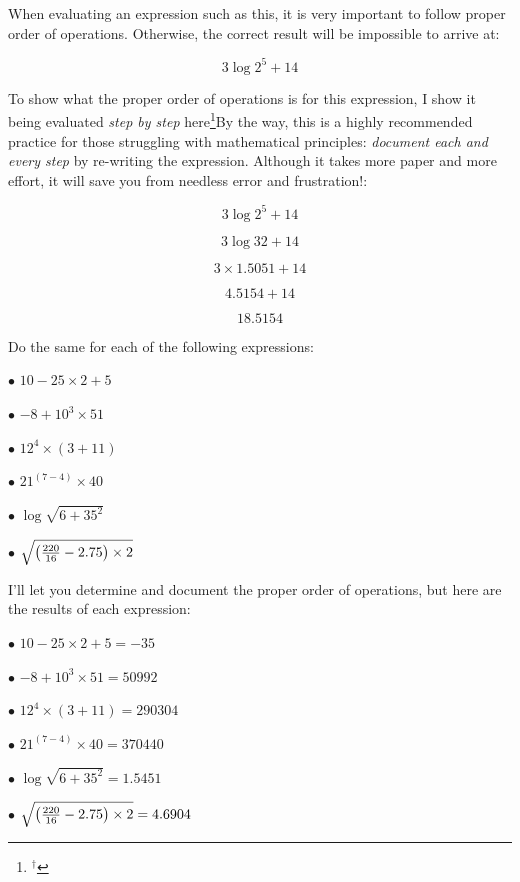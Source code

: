 

When evaluating an expression such as this, it is very important to follow proper order of operations.  Otherwise, the correct result will be impossible to arrive at:

$$3 \log 2^5 + 14$$

To show what the proper order of operations is for this expression, I show it being evaluated {\it step by step} here\footnote{$^{\dag}$}{By the way, this is a highly recommended practice for those struggling with mathematical principles: {\it document each and every step} by re-writing the expression.  Although it takes more paper and more effort, it will save you from needless error and frustration!}:

$$3 \log 2^5 + 14$$

$$3 \log 32 + 14$$

$$3 \times 1.5051 + 14$$

$$4.5154 + 14$$

$$18.5154$$

Do the same for each of the following expressions:

\medskip
\goodbreak
\item{$\bullet$} $10 - 25 \times 2 + 5$
\vskip 5pt
\item{$\bullet$} $-8 + 10^3 \times 51$
\vskip 5pt
\item{$\bullet$} $12^4 \times (3 + 11)$
\vskip 5pt
\item{$\bullet$} $21^{(7 - 4)} \times 40$
\vskip 5pt
\item{$\bullet$} $\log \sqrt{6 + 35^2}$
\vskip 5pt
\item{$\bullet$} $\sqrt{\left({220 \over 16} - 2.75\right) \times 2}$
\medskip







I'll let you determine and document the proper order of operations, but here are the results of each expression:

\medskip
\goodbreak
\item{$\bullet$} $10 - 25 \times 2 + 5 = -35$
\vskip 5pt
\item{$\bullet$} $-8 + 10^3 \times 51 = 50992$
\vskip 5pt
\item{$\bullet$} $12^4 \times (3 + 11) = 290304$
\vskip 5pt
\item{$\bullet$} $21^{(7 - 4)} \times 40 = 370440$
\vskip 5pt
\item{$\bullet$} $\log \sqrt{6 + 35^2} = 1.5451$
\vskip 5pt
\item{$\bullet$} $\sqrt{\left({220 \over 16} - 2.75\right) \times 2} = 4.6904$
\medskip

